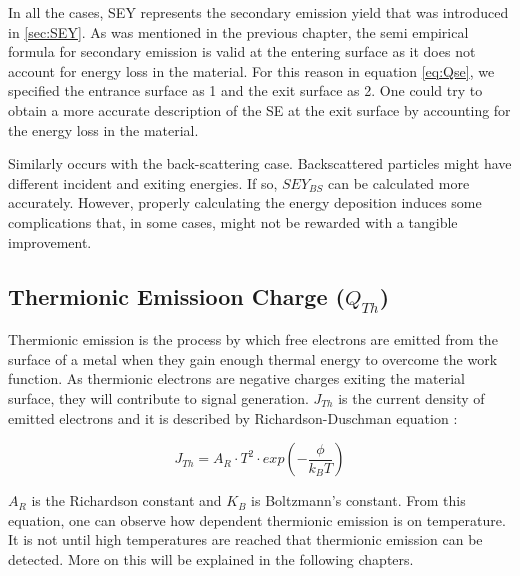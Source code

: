 In all the cases, SEY represents the secondary emission yield that was introduced in \ref{sec:SEY}. As was mentioned in the previous chapter, the semi empirical formula for secondary emission is valid at the entering surface as it does not account for energy loss in the material. For this reason in equation \ref{eq:Qse}, we specified the entrance surface as 1 and the exit surface as 2. One could try to obtain a more accurate description of the SE at the exit surface by accounting for the energy loss in the material. 

Similarly occurs with the back-scattering case. Backscattered particles might have different incident and exiting energies. If so,  $SEY_{BS}$ can be calculated more accurately. However, properly calculating the energy deposition induces some complications that, in some cases, might not be rewarded with a tangible improvement. 

\subsection{Thermionic Emissioon Charge ($Q_{Th}$)}
\label{sec:ThermoCurrent}
Thermionic emission is the process by which free electrons are emitted from the surface of a metal when they gain enough thermal energy to overcome the work function. As thermionic electrons are negative charges exiting the material surface, they will contribute to signal generation. $J_{Th}$ is the current density of emitted electrons and it is described by Richardson-Duschman equation \parencite[][]{ref:Richardson}:

\begin{equation}
    J_{Th} = A_R \cdot T^2 \cdot exp\left(-\frac{\phi}{k_B T} \right) 
    \label{eq:ThermoCurrent}
\end{equation}

$A_R$ is the Richardson constant and $K_B$ is Boltzmann's constant. From this equation, one can observe how dependent thermionic emission is on temperature. It is not until high temperatures are reached that thermionic emission can be detected. More on this will be explained in the following chapters. 
